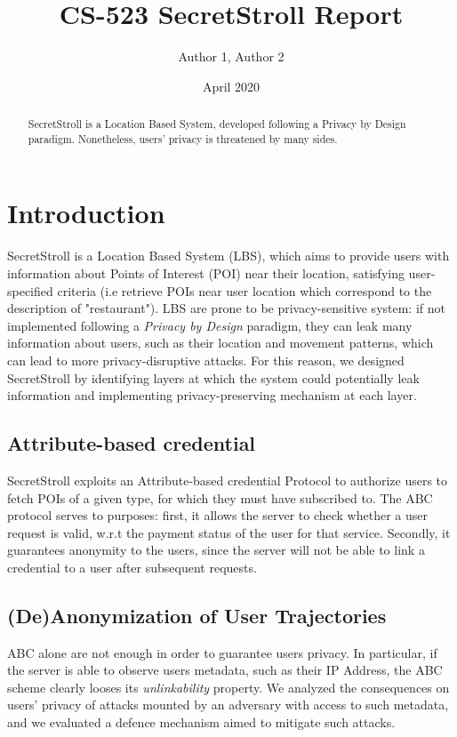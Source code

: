 \documentclass[10pt,conference,compsocconf]{IEEEtran}
\title{CS-523 SecretStroll Report}
\author{Author 1, Author 2}
\date{April 2020}
\begin{document}
\maketitle

\begin{abstract}
    SecretStroll is a Location Based System, developed following a Privacy by Design paradigm. Nonetheless, users'
    privacy is threatened by many sides.
\end{abstract}

\section{Introduction}
SecretStroll is a Location Based System (LBS), which aims to provide users with
information about Points of Interest (POI) near their location, satisfying
user-specified criteria (i.e retrieve POIs near user location which correspond
to the description of "restaurant").\newline
LBS are prone to be privacy-sensitive system: if not implemented following a
\textit{Privacy by Design} paradigm, they can leak many information about users,
such as their location and movement patterns, which can lead to more
privacy-disruptive attacks. For this reason, we designed SecretStroll
by identifying layers at which the system could potentially leak information and
implementing privacy-preserving mechanism at each layer.\newline
\subsection{Attribute-based credential}
SecretStroll exploits an Attribute-based credential Protocol to authorize users
to fetch POIs of a given type, for which they must have subscribed to. The ABC protocol serves to purposes:
first, it allows the server to check whether a user request is valid, w.r.t the payment status of the
user for that service. Secondly, it guarantees anonymity to the users, since the server will not be able
to link a credential to a user after subsequent requests.
\subsection{(De)Anonymization of User Trajectories}
ABC alone are not enough in order to guarantee users privacy. In particular, if the server is
able to observe users metadata, such as their IP Address, the ABC scheme clearly looses its
\textit{unlinkability} property. We analyzed the consequences on users' privacy of attacks
mounted by an adversary with access to such metadata, and we evaluated a defence mechanism aimed to mitigate
such attacks.
\end{document}
